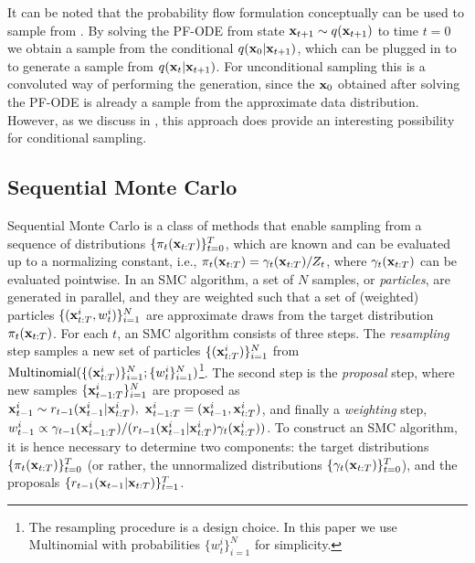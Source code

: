 \documentclass{proc}
\begin{document}
It can be noted that the probability flow formulation conceptually can be used to sample from . By solving the PF-ODE from state $\mathbf{x}_{t+1} \sim q(\mathbf{x}_{t+1})$ to time $t=0$ we obtain a sample from the conditional $q(\mathbf{x}_0|\mathbf{x}_{t+1})$, which can be plugged in to  to generate a sample from $q(\mathbf{x}_{t}|\mathbf{x}_{t+1})$. For unconditional sampling this is a convoluted way of performing the generation, since the $\mathbf{x}_0$ obtained after solving the PF-ODE is already a sample from the approximate data distribution. However, as we discuss in , this approach does provide an interesting possibility for conditional sampling.

\subsection{Sequential Monte Carlo}
\label{sec:smc_background}
Sequential Monte Carlo \citep[SMC; see, e.g.,][for an overview]{NaessethLS:2019a} is a class of methods that enable sampling from a sequence of distributions $\{\pi_t(\mathbf{x}_{t:T})\}_{t=0}^T$, which are known and can be evaluated up to a normalizing constant, i.e., $\pi_{t}(\mathbf{x}_{t:T}) = \gamma_t(\mathbf{x}_{t:T})/Z_t$, where $\gamma_t(\mathbf{x}_{t:T})$ can be evaluated pointwise. In an SMC algorithm, a set of $N$ samples, or \emph{particles}, are generated in parallel, and they are weighted such that a set of (weighted) particles $\{(\mathbf{x}_{t:T}^i, w_t^i)\}_{i=1}^N$ are approximate draws from the target distribution $\pi_t(\mathbf{x}_{t:T})$. For each $t$, an SMC algorithm consists of three steps. The \emph{resampling} step samples a new set of particles $\{(\mathbf{x}_{t:T}^i)\}_{i=1}^N$ from $\text{Multinomial}(\{(\mathbf{x}_{t:T}^i)\}_{i=1}^N; \{w_t^i\}_{i=1}^N)$\footnote{The resampling procedure is a design choice. In this paper we use Multinomial with probabilities $\{w_t^i\}_{i=1}^N$ for simplicity.}. The second step is the \emph{proposal} step, where new samples $\{\mathbf{x}_{t-1:T}^i\}_{i=1}^N$ are proposed as $\mathbf{x}_{t-1}^i\sim r_{t-1}(\mathbf{x}_{t-1}^i|\mathbf{x}_{t:T}^i), \ \mathbf{x}_{t-1:T}^i = (\mathbf{x}_{t-1}^i, \mathbf{x}_{t:T}^i)$, and finally a \emph{weighting} step, $w^i_{t-1} \propto \gamma_{t-1}(\mathbf{x}_{t-1:T}^i) / (r_{t-1}(\mathbf{x}_{t-1}^i|\mathbf{x}_{t:T}^i) \gamma_{t}(\mathbf{x}_{t:T}^i))$. To construct an SMC algorithm, it is hence necessary to determine two components: the target distributions $\{\pi_t(\mathbf{x}_{t:T})\}_{t=0}^T$ (or rather, the unnormalized distributions $\{\gamma_t(\mathbf{x}_{t:T})\}_{t=0}^T$), and the proposals $\{r_{t-1}(\mathbf{x}_{t-1}|\mathbf{x}_{t:T})\}_{t=1}^{T}$. 
\end{document}
